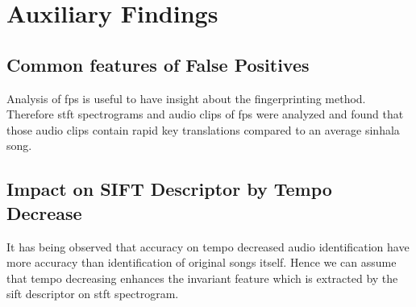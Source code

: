 \section{Auxiliary Findings}

\subsection{Common features of False Positives}

Analysis of \ac{fp}s is useful to have insight about the fingerprinting method. Therefore \ac{stft}
spectrograms and audio clips of \ac{fp}s were analyzed and found that those audio clips contain
rapid key translations compared to an average sinhala song. 

\subsection{Impact on SIFT Descriptor by Tempo Decrease}

It has being observed that accuracy on tempo decreased audio identification have more accuracy than
identification of original songs itself. Hence we can assume that tempo decreasing enhances the invariant
feature which is extracted by the \ac{sift} descriptor on \ac{stft} spectrogram.   